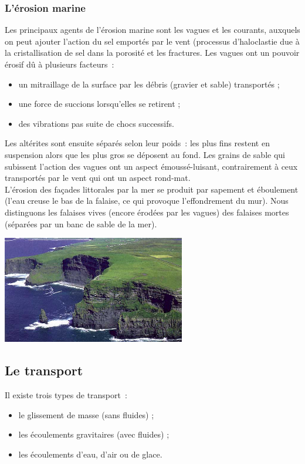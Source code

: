 \documentclass[a4paper,11pt]{article}
\begin{document}
\subsubsection{L'érosion marine}

Les principaux agents de l'érosion marine sont les vagues et les courants, auxquels on peut ajouter l'action du sel emportés par le vent (processus d'haloclastie due à la cristallisation de sel dans la porosité et les fractures.
Les vagues ont un pouvoir érosif dû à plusieurs facteurs~:
\begin{itemize}
  \item un mitraillage de la surface par les débris (gravier et sable) transportés ;
  \item une force de succions lorsqu'elles se retirent ;
  \item des vibrations pas suite de chocs successifs.
\end{itemize}
Les altérites sont ensuite séparés selon leur poids~: les plus fins restent en suspension alors que les plus gros se déposent au fond.
Les grains de sable qui subissent l'action des vagues ont un aspect émoussé-luisant, contrairement à ceux transportés par le vent qui ont un aspect rond-mat. \\

L'érosion des façades littorales par la mer se produit par sapement et éboulement (l'eau creuse le bas de la falaise, ce qui provoque l'effondrement du mur).
Nous distinguons les falaises vives (encore érodées par les vagues) des falaises mortes (séparées par un banc de sable de la mer).

\begin{center}
  \includegraphics[width=8cm]{Images/Erosion/cliffs.jpg}
\end{center}

\subsection{Le transport}
Il existe trois types de transport~:
\begin{itemize}
 \item le glissement de masse (sans fluides) ;
 \item les écoulements gravitaires (avec fluides) ;
 \item les écoulements d'eau, d'air ou de glace.
\end{itemize}
\end{document}
